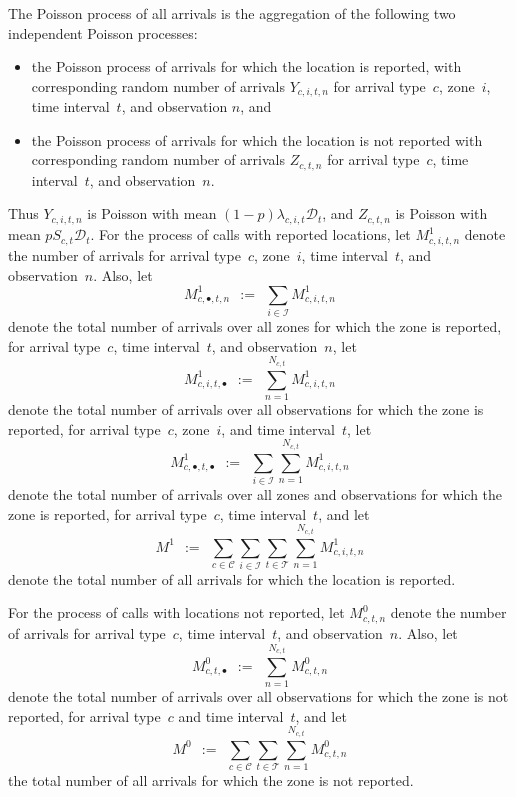 The Poisson process of all arrivals is the aggregation of the following two independent Poisson processes: 
\begin{itemize}
\item
the Poisson process of arrivals for which the location is reported, with corresponding random number of arrivals $Y_{c,i,t,n}$ for arrival type~$c$, zone~$i$, time interval~$t$, and observation $n$, and
\item
the Poisson process of arrivals for which the location is not reported with corresponding random number of arrivals $Z_{c,t,n}$ for arrival type~$c$, time interval~$t$, and observation~$n$.
\end{itemize}
Thus $Y_{c,i,t,n}$ is Poisson with mean $(1-p) \lambda_{c,i,t} \mathcal{D}_{t}$, and $Z_{c,t,n}$ is Poisson with mean $p S_{c,t} \mathcal{D}_{t}$.
For the process of calls with reported locations, let $M_{c,i,t,n}^{1}$ denote the number of arrivals for arrival type~$c$, zone~$i$, time interval~$t$, and observation~$n$.
Also, let 
$$
M_{c,\bullet,t,n}^{1} \ \ := \ \ \sum_{i \in \mathcal{I}} M_{c,i,t,n}^{1}
$$
denote the total number of arrivals over all zones for which the zone is reported, for arrival type~$c$, time interval~$t$, and observation~$n$, let
$$
M_{c,i,t,\bullet}^{1} \ \ := \ \ \sum_{n=1}^{N_{c,t}}  M_{c,i,t,n}^{1}
$$
denote the total number of arrivals over all observations for which the zone is reported, for arrival type~$c$, zone~$i$, and time interval~$t$, let
$$
M_{c,\bullet,t,\bullet}^{1} \ \ := \ \ \sum_{i \in \mathcal{I}} \sum_{n=1}^{N_{c,t}} M_{c,i,t,n}^{1}
$$
denote the total number of arrivals over all zones and observations for which the zone is reported, for arrival type~$c$, time interval~$t$, and let
$$
M^{1} \ \ := \ \ \sum_{c \in \mathcal{C}} \sum_{i \in \mathcal{I}} \sum_{t \in \mathcal{T}} \sum_{n=1}^{N_{c,t}} M_{c,i,t,n}^{1}
$$
denote the total number of all arrivals for which the location is reported.

For the process of calls with locations not reported, let $M_{c,t,n}^{0}$ denote the number of arrivals for arrival type~$c$, time interval~$t$, and observation~$n$.
Also, let
$$
M_{c,t,\bullet}^{0} \ \ := \ \ \sum_{n=1}^{N_{c,t}} M_{c,t,n}^{0}
$$
denote the total number of arrivals over all observations for which the zone is not reported, for arrival type~$c$ and time interval~$t$, and let
$$
M^{0} \ \ := \ \ \sum_{c \in \mathcal{C}} \sum_{t \in \mathcal{T}} \sum_{n=1}^{N_{c,t}} M_{c,t,n}^{0}
$$
the total number of all arrivals for which the zone is not reported.

